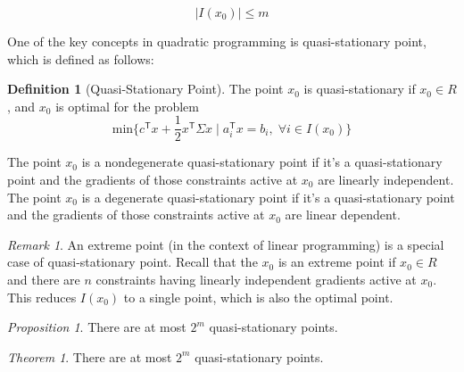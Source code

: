 \documentclass[letterpaper, oneside]{book}
\theoremstyle{definition}
\newtheorem{definition}{Definition}[chapter]
\theoremstyle{remark}
\newtheorem*{remark}{Remark}
\theoremstyle{theorem}
\newtheorem{theorem}{Theorem}[chapter]
\newtheorem{prop}{Proposition}[chapter]
\begin{document}
\begin{displaymath}
	|I(x_0)| \leq m
\end{displaymath}

One of the key concepts in quadratic programming is quasi-stationary point, which is defined as follows:

\begin{definition}[Quasi-Stationary Point]
	The point $x_0$ is quasi-stationary if $x_0\in R$, and $x_0$ is optimal for the problem
	\begin{displaymath}
		\textrm{min}\{c^{\mathsf{T}}x + \frac{1}{2}x^{\mathsf{T}}\Sigma{}x \;|\; a_i^{\mathsf{T}}x=b_i, \;\forall i \in I(x_0)  \}
	\end{displaymath}
\end{definition}

The point $x_0$ is a nondegenerate quasi-stationary point if it's a quasi-stationary point and the gradients of those constraints active at $x_0$ are linearly independent. The point $x_0$ is a degenerate quasi-stationary point if it's a quasi-stationary point and the gradients of those constraints active at $x_0$ are linear dependent.

\begin{remark}
	An extreme point (in the context of linear programming) is a special case of quasi-stationary point. Recall that the $x_0$ is an extreme point if $x_0 \in R$ and there are $n$ constraints having linearly independent gradients active at $x_0$. This reduces $I(x_0)$ to a single point, which is also the optimal point.
\end{remark}

\begin{prop}
	There are at most $2^m$ quasi-stationary points.
\end{prop}

\begin{theorem}
	There are at most $2^m$ quasi-stationary points.
\end{theorem}
\end{document}
